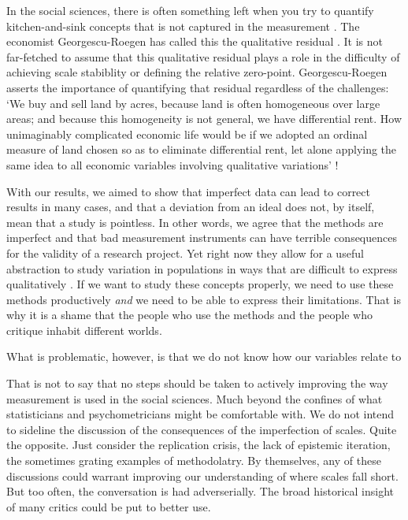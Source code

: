 \documentclass[utf8]{FrontiersinVancouver}
\begin{document}
In the social sciences, there is often something left when you try to quantify kitchen-and-sink concepts that is not captured in the measurement \citep{}. The economist Georgescu-Roegen has called this the qualitative residual \citep{georgescu-roegenMeasureQualityOptimum1965}. It is not far-fetched to assume that this qualitative residual plays a role in the difficulty of achieving scale stabiblity or defining the relative zero-point. Georgescu-Roegen asserts the importance of quantifying that residual regardless of the challenges: `We buy and sell land by acres, because land is often homogeneous over large areas; and because this homogeneity is not general, we have differential rent. How unimaginably complicated economic life would be if we adopted an ordinal measure of land chosen so as to eliminate differential rent, let alone applying the same idea to all economic variables involving qualitative variations' \citep{georgescu-roegenMeasureQualityOptimum1965}!

With our results, we aimed to show that imperfect data can lead to correct results in many cases, and that a deviation from an ideal does not, by itself, mean that a study is pointless. In other words, we agree that the methods are imperfect and that bad measurement instruments can have terrible consequences for the validity of a research project. Yet right now they allow for a useful abstraction to study variation in populations in ways that are difficult to express qualitatively \citep{}. If we want to study these concepts properly, we need to use these methods productively \textit{and} we need to be able to express their limitations. That is why it is a shame that the people who use the methods and the people who critique inhabit different worlds.

What is problematic, however, is that we do not know how our variables relate to 

That is not to say that no steps should be taken to actively improving the way measurement is used in the social sciences. Much beyond the confines of what statisticians and psychometricians might be comfortable with. We do not intend to sideline the discussion of the consequences of the imperfection of scales. Quite the opposite. Just consider the replication crisis, the lack of epistemic iteration, the sometimes grating examples of methodolatry. By themselves, any of these discussions could warrant improving our understanding of where scales fall short. But too often, the conversation is had adverserially. The broad historical insight of many critics could be put to better use. 
\end{document}

